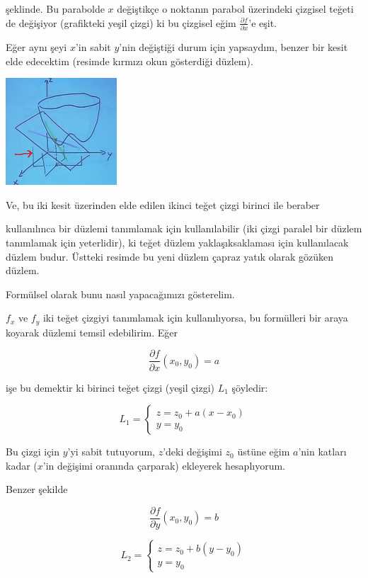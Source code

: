 \documentclass[12pt,fleqn]{article}\usepackage{../../common}
\begin{document}
şeklinde. Bu parabolde $x$ değiştikçe o noktanın parabol üzerindeki çizgisel
teğeti de değişiyor (grafikteki yeşil çizgi) ki bu çizgisel eğim $\frac{\partial
  f}{\partial x}$'e eşit.

Eğer aynı şeyi $x$'in sabit $y$'nin değiştiği durum için yapsaydım,
benzer bir kesit elde edecektim (resimde kırmızı okun gösterdiği düzlem). 

\begin{center}
\includegraphics[height=4cm]{9_2.png}
\end{center}

Ve, bu iki kesit üzerinden elde edilen ikinci teğet çizgi birinci ile beraber

kullanılınca bir düzlemi tanımlamak için kullanılabilir (iki çizgi paralel
bir düzlem tanımlamak için yeterlidir), ki teğet düzlem yaklaşıksaklaması
için kullanılacak düzlem budur. Üstteki resimde bu yeni düzlem çapraz yatık
olarak gözüken düzlem. 


Formülsel olarak bunu nasıl yapacağımızı gösterelim.

$f_x$ ve $f_y$ iki teğet çizgiyi tanımlamak için kullanılıyorsa, bu
formülleri bir araya koyarak düzlemi temsil edebilirim. Eğer

$$ \frac{\partial f}{\partial x}(x_0,y_0) = a $$

işe bu demektir ki birinci teğet çizgi (yeşil çizgi) $L_1$ şöyledir:

$$ 
L_1 = 
\left\{ \begin{array}{l}
z = z_0 + a(x - x_0) \\
y = y_0
\end{array} \right.
$$

Bu çizgi için $y$'yi sabit tutuyorum, $z$'deki değişimi $z_0$ üstüne eğim
$a$'nin katları kadar ($x$'in değişimi oranında çarparak) ekleyerek
hesaplıyorum. 

Benzer şekilde

$$ \frac{\partial f}{\partial y}(x_0,y_0) = b $$

$$ 
L_2 = 
\left\{ \begin{array}{l}
z = z_0 + b(y - y_0) \\
y = y_0
\end{array} \right.
$$
\end{document}
